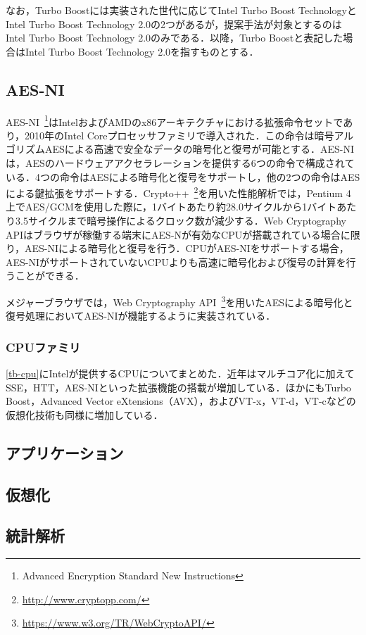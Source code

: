 なお，Turbo Boostには実装された世代に応じてIntel Turbo Boost TechnologyとIntel Turbo Boost Technology 2.0の2つがあるが，提案手法が対象とするのはIntel Turbo Boost Technology 2.0のみである．以降，Turbo Boostと表記した場合はIntel Turbo Boost Technology 2.0を指すものとする．
\subsection{AES-NI}
AES-NI~\footnote{Advanced Encryption Standard New Instructions}はIntelおよびAMDのx86アーキテクチャにおける拡張命令セットであり，2010年のIntel Coreプロセッサファミリで導入された．この命令は暗号アルゴリズムAESによる高速で安全なデータの暗号化と復号が可能とする．AES-NIは，AESのハードウェアアクセラレーションを提供する6つの命令で構成されている．4つの命令はAESによる暗号化と復号をサポートし，他の2つの命令はAESによる鍵拡張をサポートする．Crypto++~\footnote{\url{http://www.cryptopp.com/}}を用いた性能解析では，Pentium 4上でAES/GCMを使用した際に，1バイトあたり約28.0サイクルから1バイトあたり3.5サイクルまで暗号操作によるクロック数が減少する．Web Cryptography APIはブラウザが稼働する端末にAES-Nが有効なCPUが搭載されている場合に限り，AES-NIによる暗号化と復号を行う．CPUがAES-NIをサポートする場合，AES-NIがサポートされていないCPUよりも高速に暗号化および復号の計算を行うことができる．

メジャーブラウザでは，Web Cryptography API~\footnote{\url{https://www.w3.org/TR/WebCryptoAPI/}}を用いたAESによる暗号化と復号処理においてAES-NIが機能するように実装されている．
\subsubsection{CPUファミリ}
\ref{tb-cpu}にIntelが提供するCPUについてまとめた．近年はマルチコア化に加えてSSE，HTT，AES-NIといった拡張機能の搭載が増加している．ほかにもTurbo Boost，Advanced Vector eXtensions（AVX），およびVT-x，VT-d，VT-cなどの仮想化技術も同様に増加している．
\subsection{アプリケーション}
\subsection{仮想化}
\subsection{統計解析}

